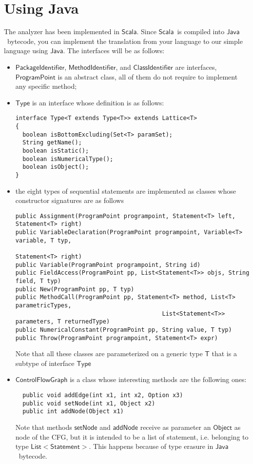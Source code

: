 \documentclass[11pt]{article}
\newcommand{\statement}[1]{\ensuremath{\mathsf{#1}}}
\newcommand{\Java}{\ensuremath{\mathsf{Java}}}
\newcommand{\Scala}{\ensuremath{\mathsf{Scala}}}
\begin{document}
\section{Using Java}
The analyzer has been implemented in \Scala. Since \Scala\ is compiled into \Java\ bytecode, you can implement the translation from your language to our simple language using \Java. The interfaces will be as follows:
\begin{itemize}
\item \statement{PackageIdentifier}, \statement{MethodIdentifier}, and \statement{ClassIdentifier} are interfaces, \statement{ProgramPoint} is an abstract class, all of them do not require to implement any specific method;
\item \statement{Type} is an interface whose definition is as follows:

\begin{lstlisting}
interface Type<T extends Type<T>> extends Lattice<T>
{
  boolean isBottomExcluding(Set<T> paramSet);
  String getName();
  boolean isStatic();
  boolean isNumericalType();
  boolean isObject();
}
\end{lstlisting}

\item the eight types of sequential statements are implemented as classes whose constructor signatures are as follows

\begin{lstlisting}
public Assignment(ProgramPoint programpoint, Statement<T> left, Statement<T> right)
public VariableDeclaration(ProgramPoint programpoint, Variable<T> variable, T typ, 
                                                                   Statement<T> right)
public Variable(ProgramPoint programpoint, String id)
public FieldAccess(ProgramPoint pp, List<Statement<T>> objs, String field, T typ)
public New(ProgramPoint pp, T typ)
public MethodCall(ProgramPoint pp, Statement<T> method, List<T> parametricTypes, 
                                          List<Statement<T>> parameters, T returnedType)
public NumericalConstant(ProgramPoint pp, String value, T typ)
public Throw(ProgramPoint programpoint, Statement<T> expr)
\end{lstlisting}

Note that all these classes are parameterized on a generic type \statement{T} that is a subtype of interface \statement{Type}

\item \statement{ControlFlowGraph} is a class whose interesting methods are the following ones:
\begin{lstlisting}
  public void addEdge(int x1, int x2, Option x3)
  public void setNode(int x1, Object x2)
  public int addNode(Object x1)
\end{lstlisting}
Note that methods \statement{setNode} and \statement{addNode} receive as parameter an \statement{Object} as node of the CFG, but it is intended to be a list of statement, i.e. belonging to type \statement{List<Statement>}. This happens because of type erasure in \Java\ bytecode.


\end{itemize}
\end{document}

